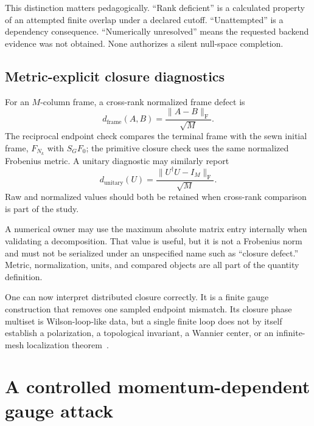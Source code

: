 This distinction matters pedagogically.  ``Rank deficient'' is a calculated
property of an attempted finite overlap under a declared cutoff.  ``Unattempted''
is a dependency consequence.  ``Numerically unresolved'' means the requested
backend evidence was not obtained.  None authorizes a silent null-space
completion.

\subsection{Metric-explicit closure diagnostics}

For an $M$-column frame, a cross-rank normalized frame defect is
\begin{equation}
  d_{\mathrm{frame}}(A,B)
  =\frac{\lVert A-B\rVert_{\mathrm F}}{\sqrt M}.
  \label{eq:training-composite-normalized-frame-defect}
\end{equation}
The reciprocal endpoint check compares the terminal frame with the sewn
initial frame, $F_{N_k}$ with $S_GF_0$; the primitive closure check uses the
same normalized Frobenius metric.  A unitary diagnostic may similarly report
\begin{equation}
  d_{\mathrm{unitary}}(U)
  =\frac{\lVert U^{\dagger}U-I_M\rVert_{\mathrm F}}{\sqrt M}.
  \label{eq:training-composite-normalized-unitarity-defect}
\end{equation}
Raw and normalized values should both be retained when cross-rank comparison is
part of the study.

A numerical owner may use the maximum absolute matrix entry internally when
validating a decomposition.  That value is useful, but it is not a Frobenius
norm and must not be serialized under an unspecified name such as
``closure defect.''  Metric, normalization, units, and compared objects are all
part of the quantity definition.

One can now interpret distributed closure correctly.  It is a finite gauge
construction that removes one sampled endpoint mismatch.  Its closure
phase multiset is Wilson-loop-like data, but a single finite loop does not by
itself establish a polarization, a topological invariant, a Wannier center, or
an infinite-mesh localization theorem~\cite{marzari2012}.

\section{A controlled momentum-dependent gauge attack}

